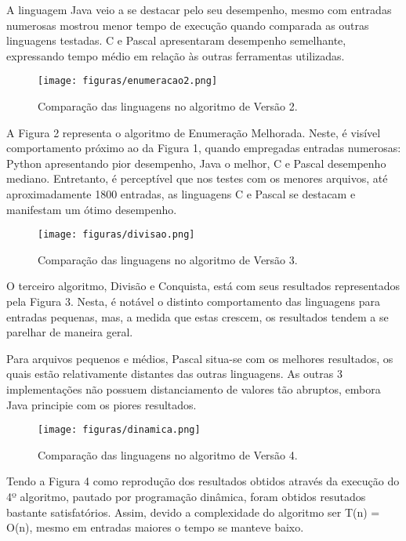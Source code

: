 \documentclass[
	12pt,				%
	oneside,   	        %
	a4paper,			%
	english,			%
	french,				%
	spanish,			%
	brazil,				%
	]{pacotes/abntex2}
\begin{document}
    A linguagem Java veio a se destacar pelo seu desempenho, mesmo com entradas numerosas mostrou menor tempo de execução quando comparada as outras linguagens testadas. C e Pascal apresentaram desempenho semelhante, expressando tempo médio em relação às outras ferramentas utilizadas.

    
    \begin{figure}[!htb]
      \centering
      \texttt{[image: figuras/enumeracao2.png]}
      \caption{Comparação das linguagens no algoritmo de Versão 2.}
      \label{fig:f2}
    \end{figure}

     A Figura 2 representa o algoritmo de Enumeração Melhorada. Neste, é visível comportamento próximo ao da Figura 1, quando empregadas entradas numerosas: Python apresentando pior desempenho, Java o melhor, C e Pascal desempenho mediano. Entretanto, é perceptível que nos testes com os menores arquivos, até aproximadamente 1800 entradas, as linguagens C e Pascal se destacam e manifestam um ótimo desempenho.

    \begin{figure}[!htb]
      \centering
      \texttt{[image: figuras/divisao.png]}
      \caption{Comparação das linguagens no algoritmo de Versão 3.}
      \label{fig:f3}
    \end{figure}
    
    O terceiro algoritmo, Divisão e Conquista, está com seus resultados representados pela Figura 3. Nesta, é notável o distinto comportamento das linguagens para entradas pequenas, mas, a medida que estas crescem, os resultados tendem a se parelhar de maneira geral.
    
    Para arquivos pequenos e médios, Pascal situa-se com os melhores resultados, os quais estão relativamente distantes das outras linguagens. As outras 3 implementações não possuem distanciamento de valores tão abruptos, embora Java principie com os piores resultados.
    
    \begin{figure}[!htb]
      \centering
      \texttt{[image: figuras/dinamica.png]}
      \caption{Comparação das linguagens no algoritmo de Versão 4.}
      \label{fig:f4}
    \end{figure}
    
    Tendo a Figura 4 como reprodução dos resultados obtidos através da execução do 4º algoritmo, pautado por programação dinâmica, foram obtidos resutados bastante satisfatórios. Assim, devido a complexidade do algoritmo ser T(n) = O(n), mesmo em entradas maiores o tempo se manteve baixo.
    
\end{document}
